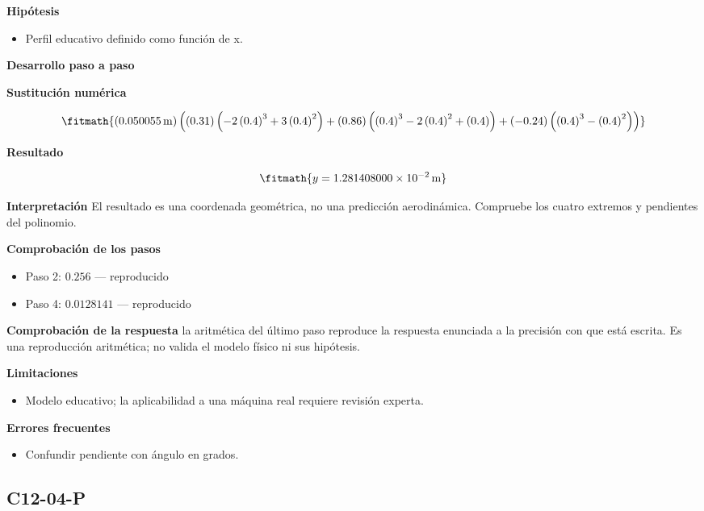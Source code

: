 \documentclass[10pt,openany]{book}
\begin{document}
\noindent\textbf{Hipótesis}
\begin{itemize}
\item Perfil educativo definido como función de x.
\end{itemize}

\noindent\textbf{Desarrollo paso a paso}



\noindent\textbf{Sustitución numérica}

\[
\fitmath{\left(0.050055\,\mathrm{m}\right) \left(\left(0.31\right) \left(- 2 \left(0.4\right)^{3} + 3 \left(0.4\right)^{2}\right) + \left(0.86\right) \left(\left(0.4\right)^{3} - 2 \left(0.4\right)^{2} + \left(0.4\right)\right) + \left(-0.24\right) \left(\left(0.4\right)^{3} - \left(0.4\right)^{2}\right)\right)}
\]

\noindent\textbf{Resultado}

\[
\fitmath{y=1.281408000\times10^{-2}\,\mathrm{m}}
\]

\noindent\textbf{Interpretación}
El resultado es una coordenada geométrica, no una predicción aerodinámica. Compruebe los cuatro extremos y pendientes del polinomio.

\noindent\textbf{Comprobación de los pasos}
\begin{itemize}
\item Paso 2: $0.256$ — reproducido
\item Paso 4: $0.0128141$ — reproducido
\end{itemize}

\noindent\textbf{Comprobación de la respuesta} la aritmética del último paso reproduce la respuesta enunciada a la precisión con que está escrita. Es una reproducción aritmética; no valida el modelo físico ni sus hipótesis.

\noindent\textbf{Limitaciones}
\begin{itemize}
\item Modelo educativo; la aplicabilidad a una máquina real requiere revisión experta.
\end{itemize}

\noindent\textbf{Errores frecuentes}
\begin{itemize}
\item Confundir pendiente con ángulo en grados.
\end{itemize}
\subsection*{C12-04-P}
\end{document}
